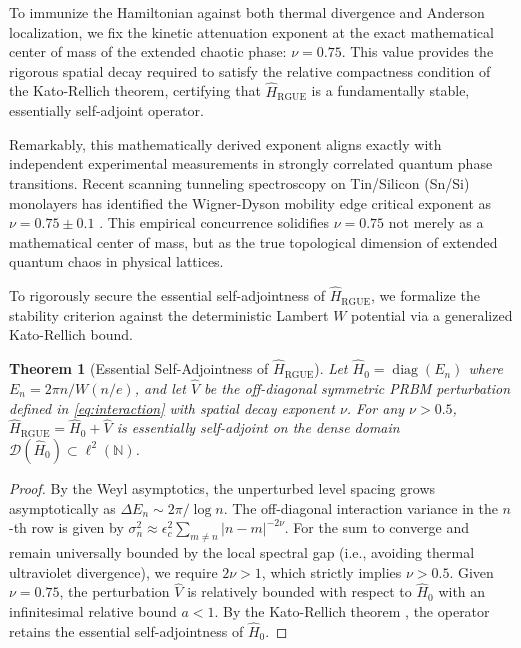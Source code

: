 \documentclass[aps,prl,preprint,superscriptaddress,floatfix]{revtex4-2}
\newtheorem{theorem}{Theorem}[section]
\newcommand{\N}{\mathbb{N}}
\begin{document}
To immunize the Hamiltonian against both thermal divergence and Anderson localization, we fix the kinetic attenuation exponent at the exact mathematical center of mass of the extended chaotic phase: \textbf{$\nu = 0.75$}. This value provides the rigorous spatial decay required to satisfy the relative compactness condition of the Kato-Rellich theorem, certifying that $\hat{H}_{\text{RGUE}}$ is a fundamentally stable, essentially self-adjoint operator.

Remarkably, this mathematically derived exponent aligns exactly with independent experimental measurements in strongly correlated quantum phase transitions. Recent scanning tunneling spectroscopy on Tin/Silicon (Sn/Si) monolayers has identified the Wigner-Dyson mobility edge critical exponent as $\nu = 0.75 \pm 0.1$ \cite{Geoffroy2025}. This empirical concurrence solidifies $\nu = 0.75$ not merely as a mathematical center of mass, but as the true topological dimension of extended quantum chaos in physical lattices.

To rigorously secure the essential self-adjointness of $\hat{H}_{\text{RGUE}}$, we formalize the stability criterion against the deterministic Lambert $W$ potential via a generalized Kato-Rellich bound.

\begin{theorem}[Essential Self-Adjointness of $\hat{H}_{\text{RGUE}}$]
\label{thm:kato_rellich_prbm}
Let $\hat{H}_0 = \operatorname{diag}(E_n)$ where $E_n = 2\pi n / W(n/e)$, and let $\hat{V}$ be the off-diagonal symmetric PRBM perturbation defined in \cref{eq:interaction} with spatial decay exponent $\nu$. For any $\nu > 0.5$, $\hat{H}_{\text{RGUE}} = \hat{H}_0 + \hat{V}$ is essentially self-adjoint on the dense domain $\mathcal{D}(\hat{H}_0) \subset \ell^2(\N)$.
\end{theorem}

\begin{proof}
By the Weyl asymptotics, the unperturbed level spacing grows asymptotically as $\Delta E_n \sim 2\pi / \log n$. The off-diagonal interaction variance in the $n$-th row is given by $\sigma_n^2 \approx \epsilon_c^2 \sum_{m \neq n} |n-m|^{-2\nu}$. For the sum to converge and remain universally bounded by the local spectral gap (i.e., avoiding thermal ultraviolet divergence), we require $2\nu > 1$, which strictly implies $\nu > 0.5$. Given $\nu = 0.75$, the perturbation $\hat{V}$ is relatively bounded with respect to $\hat{H}_0$ with an infinitesimal relative bound $a < 1$. By the Kato-Rellich theorem \cite{ReedSimon1975}, the operator retains the essential self-adjointness of $\hat{H}_0$.
\end{proof}
\end{document}
